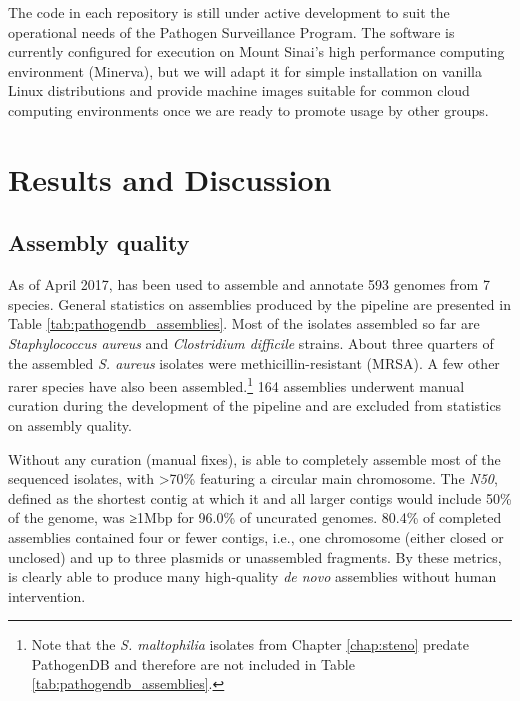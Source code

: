 The code in each repository is still under active development to suit the operational needs of the Pathogen Surveillance Program. The software is currently configured for execution on Mount Sinai's high performance computing environment (Minerva), but we will adapt it for simple installation on vanilla Linux distributions and provide machine images suitable for common cloud computing environments once we are ready to promote usage by other groups.

\section{Results and Discussion}

\subsection{Assembly quality}

As of April 2017, \pathogendbpipeline{} has been used to assemble and annotate 593 genomes from 7 species. General statistics on assemblies produced by the pipeline are presented in Table \ref{tab:pathogendb_assemblies}. Most of the isolates assembled so far are \emph{Staphylococcus aureus} and \emph{Clostridium difficile} strains. About three quarters of the assembled \emph{S. aureus} isolates were methicillin-resistant (MRSA). A few other rarer species have also been assembled.\footnote{Note that the \emph{S. maltophilia} isolates from Chapter \ref{chap:steno} predate PathogenDB and therefore are not included in Table \ref{tab:pathogendb_assemblies}.} 164 assemblies underwent manual curation during the development of the pipeline and are excluded from statistics on assembly quality.

\begin{table}[htb]
  
  \caption[Statistics on assemblies generated by \pathogendbpipeline{} since 2013]{\textbf{Statistics on assemblies generated by \pathogendbpipeline{} since 2013.} Abbreviations: \emph{N50}, shortest contig length above which 50\% of the genome is included; Mbp, 1 million base pairs; kbp, 1 thousand base pairs.
}
  \label{tab:pathogendb_assemblies}
\end{table}

Without any curation (manual fixes), \pathogendbpipeline{} is able to completely assemble most of the sequenced isolates, with >70\% featuring a circular main chromosome. The \emph{N50}, defined as the shortest contig at which it and all larger contigs would include 50\% of the genome, was ≥1Mbp for 96.0\% of uncurated genomes. 80.4\% of completed assemblies contained four or fewer contigs, i.e., one chromosome (either closed or unclosed) and up to three plasmids or unassembled fragments. By these metrics, \pathogendbpipeline{} is clearly able to produce many high-quality \emph{de novo} assemblies without human intervention.

